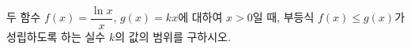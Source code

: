 두 함수 $f(x)=\dfrac{\ln x}{x}$, $g(x)=kx$에 대하여 $x>0$일 때, 부등식 $f(x)\le g(x)$가 성립하도록 하는 실수 $k$의 값의 범위를 구하시오.
